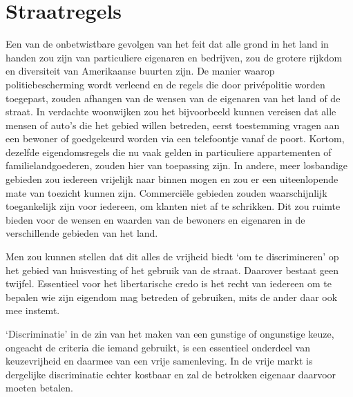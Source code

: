 \documentclass[
  a5paper,
  smalldemyvopaper,10pt,twoside,onecolumn,openright,extrafontsizes,hidelinks]{memoir}
\begin{document}
\section{Straatregels}\label{straatregels}

Een van de onbetwistbare gevolgen van het feit dat alle grond in het
land in handen zou zijn van particuliere eigenaren en bedrijven, zou de
grotere rijkdom en diversiteit van Amerikaanse buurten zijn. De manier
waarop politiebescherming wordt verleend en de regels die door
privépolitie worden toegepast, zouden afhangen van de wensen van de
eigenaren van het land of de straat. In verdachte woonwijken zou het
bijvoorbeeld kunnen vereisen dat alle mensen of auto's die het gebied
willen betreden, eerst toestemming vragen aan een bewoner of goedgekeurd
worden via een telefoontje vanaf de poort. Kortom, dezelfde
eigendomsregels die nu vaak gelden in particuliere appartementen of
familielandgoederen, zouden hier van toepassing zijn. In andere, meer
losbandige gebieden zou iedereen vrijelijk naar binnen mogen en zou er
een uiteenlopende mate van toezicht kunnen zijn. Commerciële gebieden
zouden waarschijnlijk toegankelijk zijn voor iedereen, om klanten niet
af te schrikken. Dit zou ruimte bieden voor de wensen en waarden van de
bewoners en eigenaren in de verschillende gebieden van het land.

Men zou kunnen stellen dat dit alles de vrijheid biedt `om te
discrimineren' op het gebied van huisvesting of het gebruik van de
straat. Daarover bestaat geen twijfel. Essentieel voor het libertarische
credo is het recht van iedereen om te bepalen wie zijn eigendom mag
betreden of gebruiken, mits de ander daar ook mee instemt.

`Discriminatie' in de zin van het maken van een gunstige of ongunstige
keuze, ongeacht de criteria die iemand gebruikt, is een essentieel
onderdeel van keuzevrijheid en daarmee van een vrije samenleving. In de
vrije markt is dergelijke discriminatie echter kostbaar en zal de
betrokken eigenaar daarvoor moeten betalen.
\end{document}
